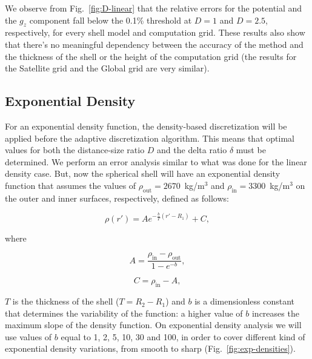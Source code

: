 \documentclass[extra, referee]{gji}
\begin{document}
We observe from Fig.~\ref{fig:D-linear} that the relative errors for the
potential and the $g_z$ component fall below the 0.1\% threshold at
$D=1$ and $D=2.5$, respectively, for every shell model and computation grid.
These results also show that there's no meaningful dependency between the accuracy of
the method and the thickness of the shell or the height of the computation grid (the
results for the Satellite grid and the Global grid are very similar).


\subsection{Exponential Density}

For an exponential density function, the density-based discretization will be applied
before the adaptive discretization algorithm.
This means that optimal values for both the distance-size ratio $D$ and the delta ratio
$\delta$ must be determined.
We perform an error analysis similar to what was done for the linear density case.
But, now the spherical shell will have an exponential density function that assumes the
values of $\rho_\text{out} = 2670$~kg/m$^3$ and $\rho_\text{in} = 3300$~kg/m$^3$ on the
outer and inner surfaces, respectively, defined as follows:

\begin{equation}
    \rho(r') = A e^{- \frac{b}{T} (r' - R_1)} + C,
    \label{eq:density-exp}
\end{equation}

\noindent where

\begin{equation}
    A = \frac{\rho_\text{in} - \rho_\text{out}}{1 - e^{-b}},
\end{equation}

\begin{equation}
    C = \rho_\text{in} - A,
\end{equation}

\noindent $T$ is the thickness of the shell ($T = R_2 - R_1$) and $b$ is a dimensionless
constant that determines the variability of the function: a higher value of $b$
increases the maximum slope of the density function.
On exponential density analysis we will use values of $b$ equal to 1, 2, 5, 10, 30
and 100, in order to cover different kind of exponential density variations, from smooth
to sharp (Fig.~\ref{fig:exp-densities}).
\end{document}
